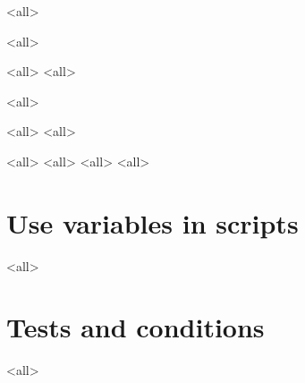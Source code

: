 \mode<all>{}

\mode<all>{}

\mode<all>{}
\mode<all>{}

\mode<all>{}

\mode<all>{}
\mode<all>{}

\mode<all>{}
\mode<all>{}
\mode<all>{}
\mode<all>{}


\section{Use variables in scripts}

\mode<all>{}

\section{Tests and conditions}
\mode<all>{}



